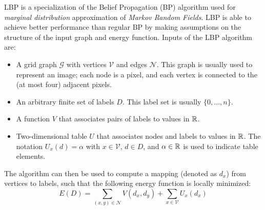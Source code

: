 \documentclass[notitlepage,english]{hgbreport}
\newcommand{\Acronym}[1]{{#1}}
\newcommand{\LBP}{\Acronym{LBP}}
\newcommand{\Vertices}{\mathcal{V}}
\newcommand{\Edges}{\mathcal{N}}
\newcommand{\Graph}{\mathcal{G}}
\begin{document}
\LBP{} is a specialization of the Belief Propagation (\Acronym{BP}) algorithm used for \emph{marginal distribution} approximation of \emph{Markov Random Fields}. \LBP{} is able to achieve better performance than regular \Acronym{BP} by making assumptions on the structure of the input graph and energy function.
Inputs of the \LBP{} algorithm are:
\begin{itemize}
	\item A grid graph $\Graph$ with vertices $\Vertices$ and edges $\Edges$. This graph is usually used to represent an image; each node is a pixel, and each vertex is connected to the (at  most four) adjacent pixels. 
	\item An arbitrary finite set of labels $D$. This label set is usually $\{0, ... , n\}$.
	\item A function $V$ that associates pairs of labels to values in $\mathbb{R}$.
	\item Two-dimensional table $U$ that associates nodes and labels to values in $\mathbb{R}$. The notation $U_x(d) = \alpha$ with $x\in\Vertices$, $d\in D$, and $\alpha \in \mathbb{R}$ is used to indicate table elements.
\end{itemize}
The algorithm can then be used to compute a mapping (denoted as $d_x$) from vertices to labels, such that the following energy function is locally minimized:
\begin{equation} \label{eq:lbp-example-energy}
E(D) = \sum_{(x,y)\in \Edges} V(d_x,d_y) + \sum_{x\in\Vertices} U_x(d_x) 
\end{equation}


\MakeBibliography[nosplit]
\end{document}
